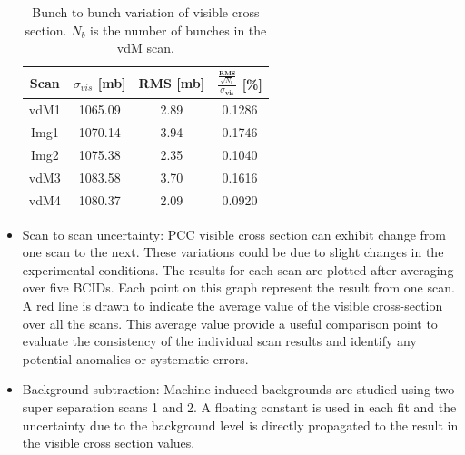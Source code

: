 \begin{itemize}
\begin{table}[!htp]
  \centering
  \caption[Bunch uncertainty]{Bunch to bunch variation of visible cross section. $N_b$ is the number of bunches in the vdM scan.}
\begin{tabular}{cccc}
\textbf{Scan} & \textbf{$\sigma_{vis}$ [mb]} & \textbf{RMS [mb]} & $\frac{\frac{\textbf{RMS}}{\sqrt{N_b}}}{\sigma_{\textbf{vis}}}$ [\%] \\
\hline
vdM1 & 1065.09 & 2.89 & 0.1286 \\
Img1 & 1070.14 & 3.94 & 0.1746 \\
Img2 & 1075.38 & 2.35 & 0.1040 \\
vdM3 & 1083.58 & 3.70 & 0.1616 \\
vdM4 & 1080.37 & 2.09 & 0.0920 \\
\end{tabular}
\label{tab:my_label}
\end{table}


\newpage
\item Scan to scan uncertainty: PCC visible cross section can exhibit change from one scan to the next. These variations could be due to slight changes in the experimental conditions. The results for each scan are plotted after averaging over five BCIDs. Each point on this graph represent the result from one scan. A red line is drawn to indicate the average value of the visible cross-section over all the scans. This average value provide a useful comparison point to evaluate the consistency of the individual scan results and identify any potential anomalies or systematic errors.



\item Background subtraction: %
  Machine-induced backgrounds are studied using two super separation scans 1 and 2. A floating constant is used in each fit and the uncertainty due to the background level is directly propagated to the result in the visible cross section values.


\end{itemize}
